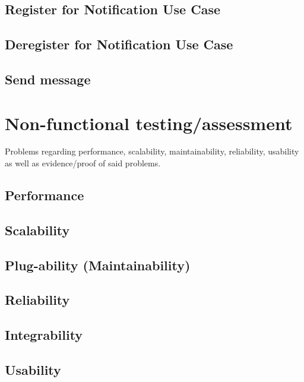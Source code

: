 \documentclass[a4paper,12pt,titlepage]{article}
\begin{document}
\subsection{Register for Notification Use Case}
	
	
\subsection{Deregister for Notification Use Case}
	
	
\subsection{Send message}
	

\newpage

\section{Non-functional testing/assessment}
Problems regarding performance, scalability, maintainability, reliability, usability as well as evidence/proof of said problems.

\subsection{Performance}
	
	
\subsection{Scalability}
	
	
\subsection{Plug-ability (Maintainability)}
	
	
\subsection{Reliability}
	

\subsection{Integrability}
	
	
\subsection{Usability}
	
	
\end{document}
